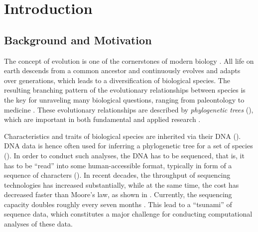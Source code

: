 
\chapter{Introduction}
\label{ch:Introduction}


\section{Background and Motivation}
\label{ch:Introduction:sec:Motivation}

The concept of evolution is one of the cornerstones of modern biology \cite{Dobzhansky1973}.
All life on earth descends from a common ancestor and continuously evolves and adapts over generations,
which leads to a diversification of biological species.
The resulting branching pattern of the evolutionary relationships between species
is the key for unraveling many biological questions,
ranging from paleontology \cite{Schaeffer1972} to medicine \cite{Hartfield2014}. %
These evolutionary relationships are described by \emph{phylogenetic trees}
(),
which are important in both fundamental \cite{Misof2014,Jarvis2014,Zanne2014} and
applied research \cite{Futuyma1995,Hendry2011,Schwartz2017}.

Characteristics and traits of biological species are inherited via their DNA
().
DNA data is hence often used for inferring a phylogenetic tree for a set of species
().
In order to conduct such analyses, the DNA has to be sequenced,
that is, it has to be ``read'' into some human-accessible format,
typically in form of a sequence of characters
().
In recent decades, the throughput of sequencing technologies has increased substantially,
while at the same time, the cost has decreased faster than Moore's law,
as shown in .
Currently, the sequencing capacity doubles roughly every seven months \cite{Stephens2015}.
This lead to a ``tsunami'' of sequence data,
which constitutes a major challenge for conducting computational analyses of these data.

